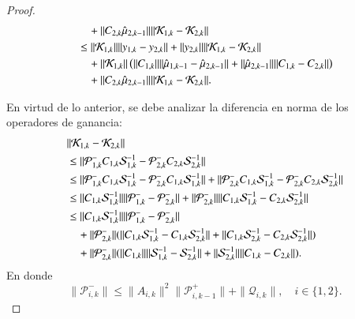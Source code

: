 \begin{proof}
\begin{align*}
		& \quad + \| C_{2,k} \hat\mu_{2,k-1} \| \| \mathcal{K}_{1,k}  - \mathcal{K}_{2,k} \| \\
		& \leq \| \mathcal{K}_{1,k} \| \|  y_{1,k} - y_{2,k}  \| + \| y_{2,k} \| \| \mathcal{K}_{1,k}  -  \mathcal{K}_{2,k}  \| \\
		& \quad + \| \mathcal{K}_{1,k} \| \left ( \| C_{1,k}  \| \|  \hat\mu_{1,k-1} - \hat\mu_{2,k-1}  \| + \| \hat\mu_{2,k-1}  \| \| C_{1,k} - C_{2,k}  \| \right ) \\
		& \quad + \| C_{2,k} \hat\mu_{2,k-1} \| \| \mathcal{K}_{1,k}  - \mathcal{K}_{2,k} \|.
\end{align*}
\endgroup

En virtud de lo anterior, se debe analizar la diferencia en norma de los operadores de ganancia:
\begin{equation*}
	\begin{aligned}
		& \| \mathcal{K}_{1,k}  - \mathcal{K}_{2,k} \| \\
		& \leq \| \mathcal{P}_{1,k}^- C_{1,k}\mathcal{S}_{1,k}^{-1} -  \mathcal{P}_{2,k}^- C_{2,k} \mathcal{S}_{2,k}^{-1} \| \\
		& \leq \| \mathcal{P}_{1,k}^- C_{1,k}\mathcal{S}_{1,k}^{-1} - \mathcal{P}_{2,k}^- C_{1,k}\mathcal{S}_{1,k}^{-1} \| + \| \mathcal{P}_{2,k}^- C_{1,k}\mathcal{S}_{1,k}^{-1} - \mathcal{P}_{2,k}^- C_{2,k}\mathcal{S}_{2,k}^{-1} \| \\
		& \leq \| C_{1,k}\mathcal{S}_{1,k}^{-1} \| \| \mathcal{P}_{1,k}^- - \mathcal{P}_{2,k}^-\| + \| \mathcal{P}_{2,k}^- \| \|  C_{1,k}\mathcal{S}_{1,k}^{-1} -  C_{2,k}\mathcal{S}_{2,k}^{-1}\| \\
		& \leq \| C_{1,k}\mathcal{S}_{1,k}^{-1} \| \| \mathcal{P}_{1,k}^- - \mathcal{P}_{2,k}^-\| \\
		& \quad + \| \mathcal{P}_{2,k}^- \| ( \|  C_{1,k}\mathcal{S}_{1,k}^{-1} -  C_{1,k}\mathcal{S}_{2,k}^{-1}\| + \|  C_{1,k}\mathcal{S}_{2,k}^{-1} -  C_{2,k}\mathcal{S}_{2,k}^{-1}\|) \\
		& \quad + \| \mathcal{P}_{2,k}^- \| ( \|  C_{1,k} \| \| \mathcal{S}_{1,k}^{-1} -  \mathcal{S}_{2,k}^{-1}\| + \| \mathcal{S}_{2,k}^{-1} \| \| C_{1,k} -  C_{2,k}\|).
	\end{aligned}
\end{equation*}
En donde
\begin{equation*}
	\| \mathcal{P}_{i,k}^- \|  \leq \| A_{i,k} \|^2 \| \mathcal{P}_{i,k-1}^+\| + \| \mathcal{Q}_{i,k}\|, \quad i \in \{ 1, 2 \}.
\end{equation*}


\end{proof}
